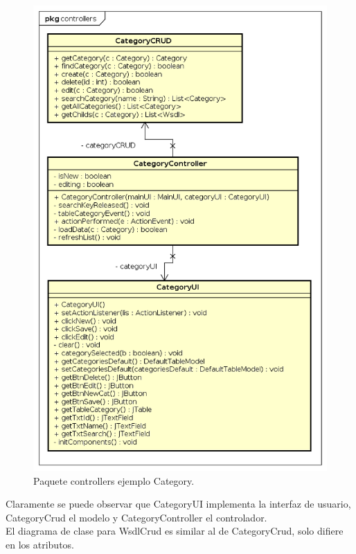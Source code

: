  \begin{figure}[H]  
 	\begin{center}
 		\includegraphics [scale=0.60]{imagenes/paquete_controllers.png}
 	\end{center}
 	\caption{Paquete controllers ejemplo Category.}
 	\label{fig:Paquete controllers ejemplo category}
 \end{figure} 


 Claramente se puede observar que CategoryUI implementa la interfaz de usuario, CategoryCrud el modelo y CategoryController el controlador.\\
 
 El diagrama de clase para WsdlCrud es similar al de CategoryCrud, solo difiere en los atributos.\\
 
